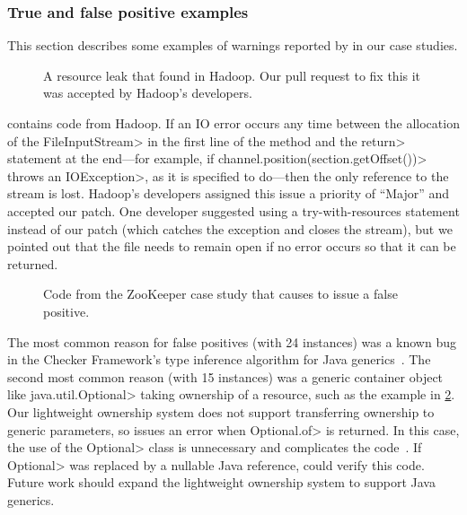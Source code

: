 \subsubsection{True and false positive examples}
\label{sec:examples}

This section describes some examples of warnings reported by \tool
in our case studies.

\begin{figure}
  
  \prefigcaption
  \caption{A resource leak that \tool found in Hadoop. Our pull request
    to fix this it was accepted by Hadoop's developers.}
  \label{fig:hadoop-bug}
\end{figure}

 contains code from Hadoop. If an IO error
occurs any time between the allocation of the \<FileInputStream>
in the first line of the method and the \<return> statement
at the end---for example, if \<channel.position(section.getOffset())>
throws an \<IOException>, as it is specified to do---then the
only reference to the stream is lost. Hadoop's developers
assigned this issue a priority of ``Major'' and accepted our
patch.
One developer suggested using a try-with-resources statement instead
of our patch (which catches the exception and closes the stream),
but we pointed out that
the file needs to remain open if no error occurs so that it can be
returned.

\begin{figure}
  
  \prefigcaption
  \caption{Code from the ZooKeeper case study that causes \tool
  to issue a false positive.}
  \label{fig:zookeeper-optional}
\end{figure}

The most common reason for false
positives (with 24 instances) was
a known bug in the Checker Framework’s
type inference algorithm for Java generics~\cite{issue979}.
The second most common reason (with 15 instances)
was a generic container object like \<java.util.Optional> taking ownership of a resource, such
as the example in \cref{fig:zookeeper-optional}. Our lightweight ownership
system does not support transferring ownership to generic parameters,
so \tool issues an error when \<Optional.of> is returned. In this case, the use
of the \<Optional> class is unnecessary and complicates the
code~\cite{ErnstNothingIsBetterThanOptional}.  If \<Optional> was replaced
by a nullable Java reference,
\tool could verify this code. Future work should expand the lightweight ownership system to
support Java generics.


